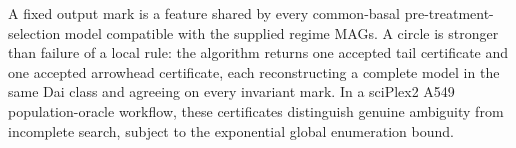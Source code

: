 A fixed output mark is a feature shared by every common-basal pre-treatment-selection model compatible with the supplied regime MAGs.  A circle is stronger than failure of a local rule: the algorithm returns one accepted tail certificate and one accepted arrowhead certificate, each reconstructing a complete model in the same Dai class and agreeing on every invariant mark.  In a sciPlex2 A549 population-oracle workflow, these certificates distinguish genuine ambiguity from incomplete search, subject to the exponential global enumeration bound.
